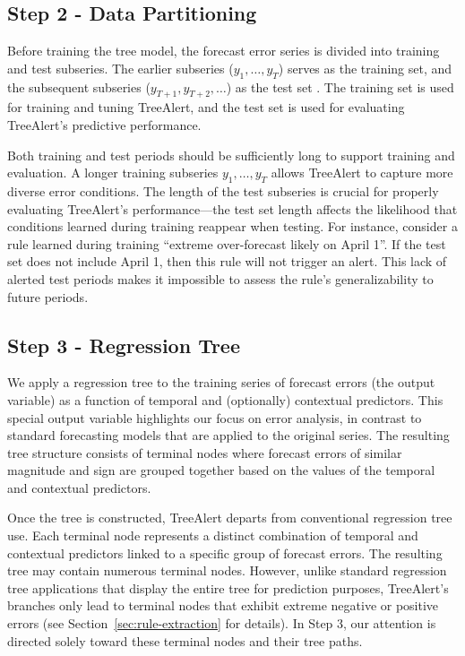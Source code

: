 \documentclass[12pt]{article}
\begin{document}
\subsection{Step 2 - Data Partitioning}

Before training the tree model, the forecast error series is divided into training and test subseries. The earlier subseries ($y_1, \ldots, y_T$) serves as the training set, and the subsequent subseries ($y_{T+1}, y_{T+2}, \ldots$) as the test set \citep{shmueli2024}. The training set is used for training and tuning TreeAlert, and the test set is used for evaluating TreeAlert's predictive performance.

Both training and test periods should be sufficiently long to support training and evaluation. %
A longer training subseries $y_1, \ldots, y_T$ allows TreeAlert to capture more diverse error conditions. %
The length of the test subseries is crucial for properly evaluating TreeAlert's performance---the test set length affects %
the likelihood that conditions learned during training reappear when testing. For instance, consider a rule learned during training ``extreme over-forecast likely on April 1''. If the test set does not include April 1, then this rule will not trigger an alert. This lack of alerted test periods makes it impossible to assess the rule's generalizability to future periods.

\subsection{Step 3 - Regression Tree}
We apply a regression tree to the training series of forecast errors (the output variable) as a function of temporal and (optionally) contextual predictors. This special output variable highlights our focus on error analysis, in contrast to standard forecasting models that are applied to the original series. The resulting tree structure consists of terminal nodes where forecast errors of similar magnitude and sign are grouped together based on the values of the temporal and contextual predictors. 

Once the tree is constructed, TreeAlert departs from conventional regression tree use. Each terminal node represents a distinct combination of temporal and contextual predictors linked to a specific group of forecast errors. The resulting tree may contain numerous terminal nodes. However, unlike standard regression tree applications that display the entire tree for prediction purposes, TreeAlert’s branches only lead to terminal nodes that exhibit extreme negative or positive errors (see Section~\ref{sec:rule-extraction} for details). In Step 3, our attention is directed solely toward these terminal nodes and their tree paths.
\end{document}
